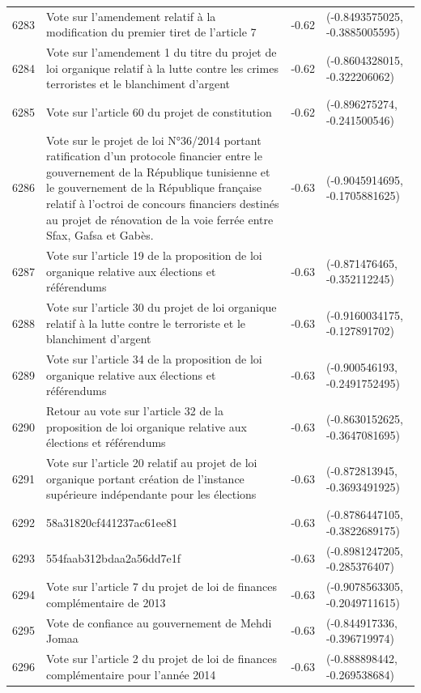 \begin{table}[ht]
\begin{tabular}{rlrl}
  6283 & Vote sur l'amendement relatif à la modification du premier tiret de l'article 7 & -0.62 & (-0.8493575025, -0.3885005595) \\ 
  6284 & Vote sur l'amendement 1 du titre du projet de loi organique relatif à la lutte contre les crimes terroristes et le blanchiment d'argent & -0.62 & (-0.8604328015, -0.322206062) \\ 
  6285 & Vote sur l'article 60 du projet de constitution & -0.62 & (-0.896275274, -0.241500546) \\ 
  6286 & Vote sur le projet de loi N°36/2014 portant ratification d'un protocole financier entre le gouvernement de la République tunisienne et le gouvernement de la République française relatif à l'octroi de concours financiers destinés au projet de rénovation de la voie ferrée entre Sfax, Gafsa et Gabès. & -0.63 & (-0.9045914695, -0.1705881625) \\ 
  6287 & Vote sur l'article 19 de la proposition de loi organique relative aux élections et référendums & -0.63 & (-0.871476465, -0.352112245) \\ 
  6288 & Vote sur l'article 30 du projet de loi organique relatif à la lutte contre le terroriste et le blanchiment d'argent & -0.63 & (-0.9160034175, -0.127891702) \\ 
  6289 & Vote sur l'article 34 de la proposition de loi organique relative aux élections et référendums & -0.63 & (-0.900546193, -0.2491752495) \\ 
  6290 & Retour au vote sur l'article 32 de la proposition de loi organique relative aux élections et référendums & -0.63 & (-0.8630152625, -0.3647081695) \\ 
  6291 & Vote sur l'article 20 relatif au projet de loi organique portant création de l'instance supérieure indépendante pour les élections & -0.63 & (-0.872813945, -0.3693491925) \\ 
  6292 & 58a31820cf441237ac61ee81 & -0.63 & (-0.8786447105, -0.3822689175) \\ 
  6293 & 554faab312bdaa2a56dd7e1f & -0.63 & (-0.8981247205, -0.285376407) \\ 
  6294 & Vote sur l'article 7 du projet de loi de finances complémentaire de 2013 & -0.63 & (-0.9078563305, -0.2049711615) \\ 
  6295 & Vote de confiance au gouvernement de Mehdi Jomaa & -0.63 & (-0.844917336, -0.396719974) \\ 
  6296 & Vote sur l'article 2 du projet de loi de finances complémentaire pour l'année 2014 & -0.63 & (-0.888898442, -0.269538684) \\ 

\end{tabular}
\end{table}
